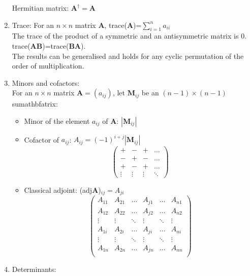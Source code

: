 \documentclass[fleqn]{article}
\begin{document}
\begin{enumerate}
        Hermitian matrix: $\mathbf{A}^\dagger=\mathbf{A}$
    \item Trace: 
        For an $n\times n$ matrix $\mathbf{A}$, trace($\mathbf{A}$)=$\displaystyle\sum_{i=1}^n a_{ii}$\\
        The trace of the product of a symmetric and an antisymmetric matrix is 0.\\
        trace($\mathbf{AB}$)=trace($\mathbf{BA}$).\\
        The results can be generalised and holds for any cyclic permutation of the order of multiplication.
    \item Minors and cofactors:\\
        For an $n\times n$ matrix $\mathbf{A}=(a_{ij})$, let $\mathbf{M}_{ij}$ be an $(n-1)\times(n-1)$ sumathbfatrix:
        \begin{itemize}[noitemsep, topsep=0pt]
            \item Minor of the element $a_{ij}$ of $\mathbf{A}$: $|\mathbf{M}_{ij}|$
            \item Cofactor of $a_{ij}$: $A_{ij}=(-1)^{i+j}|\mathbf{M}_{ij}|$
                \[\begin{pmatrix}
                    + & - & + & \dots \\
                    - & + & - & \dots \\
                    + & - & + & \dots \\
                    \vdots & \vdots & \vdots & \ddots
                \end{pmatrix}\]
            \item Classical adjoint: (adj$\mathbf{A}$)$_{ij}=A_{ji}$
                \[\begin{pmatrix}
                    A_{11} & A_{21} & \dots  & A_{j1} & \dots  & A_{n1}\\
                    A_{12} & A_{22} & \dots  & A_{j2} & \dots  & A_{n2}\\
                    \vdots & \vdots & \ddots & \vdots & \ddots & \vdots\\
                    A_{1i} & A_{2i} & \dots  & A_{ji} & \dots  & A_{ni}\\
                    \vdots & \vdots & \ddots & \vdots & \ddots & \vdots\\
                    A_{1n} & A_{2n} & \dots  & A_{jn} & \dots  & A_{nn}\\
                \end{pmatrix}\]
        \end{itemize}
    \item Determinants:\smallbreak

\end{enumerate}
\end{document}
